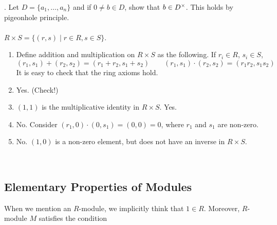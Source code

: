 \pf. Let $D = \{a_1, \dots, a_n\}$ and if $0\neq b\in D$, show that $b\in D^\times$. This holds by pigeonhole principle.\\
\\
 $R\times S = \{(r, s) \mid r\in R, s\in S\}$.
\begin{enumerate} 
	\item Define addition and multiplication on $R\times S$ as the following. If $r_i \in R$, $s_i\in S$,
	$$(r_1, s_1) + (r_2, s_2) = (r_1+r_2, s_1+s_2) \qquad (r_1, s_1)\cdot (r_2, s_2) = (r_1r_2, s_1s_2)$$
	It is easy to check that the ring axioms hold.
	\item Yes. (Check!)
	\item $(1, 1)$ is the multiplicative identity in $R\times S$. Yes.
	\item No. Consider $(r_1, 0)\cdot (0, s_1) = (0, 0) = 0$, where $r_1$ and $s_1$ are non-zero.
	\item No. $(1, 0)$ is a non-zero element, but does not have an inverse in $R\times S$.
\end{enumerate}~\\

\subsection{Elementary Properties of Modules}
When we mention an $R$-module, we implicitly think that $1 \in R$. Moreover, $R$-module $M$ satisfies the condition


